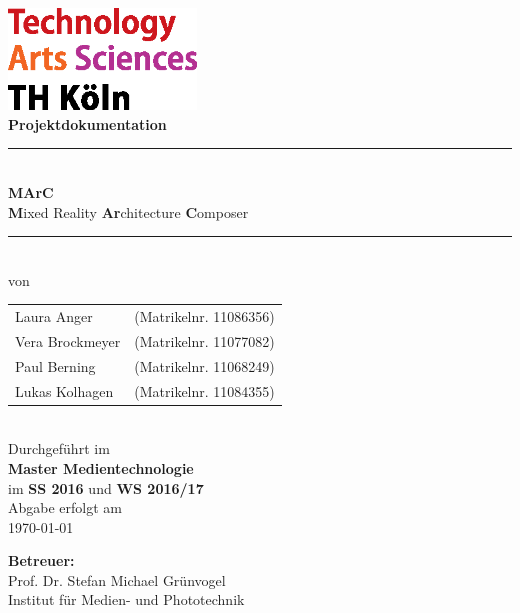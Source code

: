 \thispagestyle{empty}
\begin{center}
			\includegraphics[width=5cm]{Bilder/logo_TH}\\[12ex]
			{\Huge\textbf{Projektdokumentation}}\\[8ex]
			\rule{.8\textwidth}{.2pt}
			{\Large\\[1ex] \textbf{MArC}}\\
			{\textbf{M}ixed Reality \textbf{Ar}chitecture \textbf{C}omposer}\\
			\rule{.8\textwidth}{.2pt}\\[10ex]
			von\\[2ex]
			\begin{tabular}{ll}
			Laura Anger &(Matrikelnr. 11086356)\\ 
			Vera Brockmeyer &(Matrikelnr. 11077082)\\
			Paul Berning &(Matrikelnr. 11068249)\\
			Lukas Kolhagen &(Matrikelnr. 11084355)\\
			\end{tabular}\\[10ex]
			Durchgeführt im\\ \textbf{Master Medientechnologie}\\
			im \textbf{SS 2016} und \textbf{WS 2016/17}\\[4ex]
			Abgabe erfolgt am\\
			\today
			\end{center}
			\vfill
			\begin{flushleft}
			{\bf Betreuer:}\\
			Prof. Dr. Stefan Michael Grünvogel\\
			Institut für Medien- und Phototechnik
			\end{flushleft}
	\newpage